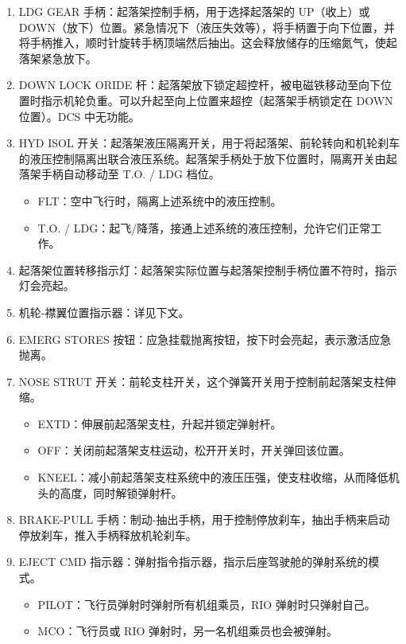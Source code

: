 \begin{enumerate}
  \item LDG GEAR 手柄：起落架控制手柄，用于选择起落架的 UP（收上）或 DOWN（放下）位置。紧急情况下（液压失效等），将手柄置于向下位置，并将手柄推入，顺时针旋转手柄顶端然后抽出。这会释放储存的压缩氮气，使起落架紧急放下。
  \item DOWN LOCK ORIDE 杆：起落架放下锁定超控杆，被电磁铁移动至向下位置时指示机轮负重。可以升起至向上位置来超控（起落架手柄锁定在 DOWN 位置）。DCS 中无功能。
  \item HYD ISOL 开关：起落架液压隔离开关，用于将起落架、前轮转向和机轮刹车的液压控制隔离出联合液压系统。起落架手柄处于放下位置时，隔离开关由起落架手柄自动移动至 T.O. / LDG 档位。
  \begin{itemize}
    \item FLT：空中飞行时，隔离上述系统中的液压控制。
    \item T.O. / LDG：起飞/降落，接通上述系统的液压控制，允许它们正常工作。
  \end{itemize}
  \item 起落架位置转移指示灯：起落架实际位置与起落架控制手柄位置不符时，指示灯会亮起。
  \item 机轮-襟翼位置指示器：详见下文。
  \item EMERG STORES 按钮：应急挂载抛离按钮，按下时会亮起，表示激活应急抛离。
  \item NOSE STRUT 开关：前轮支柱开关，这个弹簧开关用于控制前起落架支柱伸缩。
  \begin{itemize}
    \item EXTD：伸展前起落架支柱，升起并锁定弹射杆。
    \item OFF：关闭前起落架支柱运动，松开开关时，开关弹回该位置。
    \item KNEEL：减小前起落架支柱系统中的液压压强，使支柱收缩，从而降低机头的高度，同时解锁弹射杆。
  \end{itemize}
  \item BRAKE-PULL 手柄：制动-抽出手柄，用于控制停放刹车，抽出手柄来启动停放刹车，推入手柄释放机轮刹车。
  \item EJECT CMD 指示器：弹射指令指示器，指示后座驾驶舱的弹射系统的模式。
  \begin{itemize}
    \item PILOT：飞行员弹射时弹射所有机组乘员，RIO 弹射时只弹射自己。
    \item MCO：飞行员或 RIO 弹射时，另一名机组乘员也会被弹射。
  \end{itemize}
\end{enumerate}

